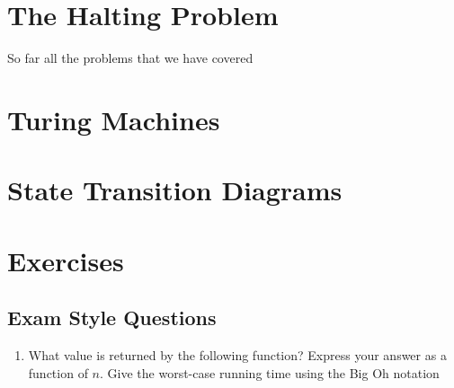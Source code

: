 	\section{The Halting Problem}
		So far all the problems that we have covered
	\section{Turing Machines}
	
	\section{State Transition Diagrams}
	
	\section{Exercises}
		
		\subsection{Exam Style Questions}
			\begin{enumerate}
				\item What value is returned by the following function? Express your answer as a function of $n$. Give the worst-case running time using the Big Oh notation
			\end{enumerate}